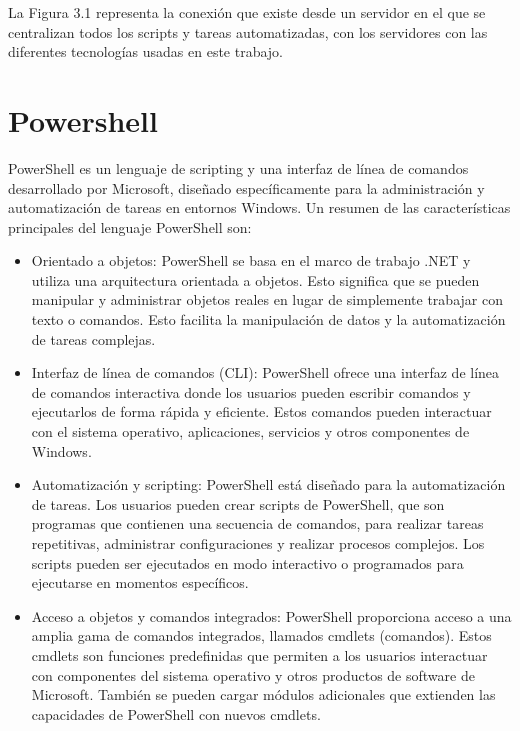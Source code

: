 \documentclass[a4paper, 12pt]{book}
\begin{document}
La Figura 3.1 representa la conexión que existe desde un servidor en el que se centralizan todos los scripts y tareas automatizadas, con los servidores con las diferentes tecnologías usadas en este trabajo.

\section{Powershell}
\label{sec:Powershell}

PowerShell es un lenguaje de scripting y una interfaz de línea de comandos desarrollado por Microsoft, diseñado específicamente para la administración y automatización de tareas en entornos Windows. Un resumen de las características principales del lenguaje PowerShell son:

\begin{itemize}

\item Orientado a objetos: PowerShell se basa en el marco de trabajo .NET y utiliza una arquitectura orientada a objetos. Esto significa que se pueden manipular y administrar objetos reales en lugar de simplemente trabajar con texto o comandos. Esto facilita la manipulación de datos y la automatización de tareas complejas.

\item Interfaz de línea de comandos (CLI): PowerShell ofrece una interfaz de línea de comandos interactiva donde los usuarios pueden escribir comandos y ejecutarlos de forma rápida y eficiente. Estos comandos pueden interactuar con el sistema operativo, aplicaciones, servicios y otros componentes de Windows.

\item Automatización y scripting: PowerShell está diseñado para la automatización de tareas. Los usuarios pueden crear scripts de PowerShell, que son programas que contienen una secuencia de comandos, para realizar tareas repetitivas, administrar configuraciones y realizar procesos complejos. Los scripts pueden ser ejecutados en modo interactivo o programados para ejecutarse en momentos específicos.

\item Acceso a objetos y comandos integrados: PowerShell proporciona acceso a una amplia gama de comandos integrados, llamados cmdlets (comandos). Estos cmdlets son funciones predefinidas que permiten a los usuarios interactuar con componentes del sistema operativo y otros productos de software de Microsoft. También se pueden cargar módulos adicionales que extienden las capacidades de PowerShell con nuevos cmdlets.


\end{itemize}
\end{document}
